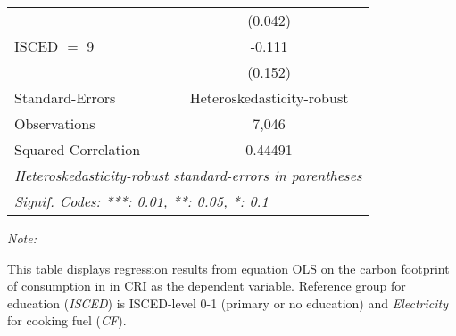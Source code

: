 \begin{table}[htbp!]
\begin{adjustbox}{width = 1\textwidth, max height = 0.95\textheight, center}
\begin{threeparttable}[b]
\begin{tabular}{lc}
                                & (0.042)\\   
            ISCED $=$ 9         & -0.111\\   
                                & (0.152)\\   
            \midrule 
            Standard-Errors     & Heteroskedasticity-robust \\   
            Observations        & 7,046\\  
            Squared Correlation & 0.44491\\  
            \midrule \midrule
            \multicolumn{2}{l}{\emph{Heteroskedasticity-robust standard-errors in parentheses}}\\
            \multicolumn{2}{l}{\emph{Signif. Codes: ***: 0.01, **: 0.05, *: 0.1}}\\
         \end{tabular}
         
         \begin{tablenotes}\item \medskip \textit{Note:}
            \item This table displays regression results from equation OLS on the carbon footprint of consumption in  in CRI as the dependent variable.  Reference group for education (\textit{ISCED}) is ISCED-level 0-1 (primary or no education) and \textit{Electricity} for cooking fuel (\textit{CF}).
         \end{tablenotes}
      \end{threeparttable}
   \end{adjustbox}
\end{table}


